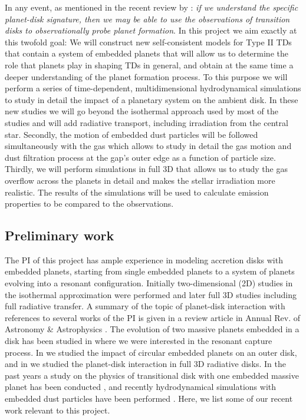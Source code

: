 \documentclass[10pt,fleqn,twoside]{article}
\begin{document}
In any event, as mentioned in the recent review by \citep{2016PASA...33....5O}: 
{\it if we understand the specific planet-disk signature, then we may be able to
use the observations of transition disks to observationally probe planet formation}.
In this project we aim exactly at this twofold goal: We will construct new self-consistent models 
for Type II TDs that contain a system of embedded planets that will allow us to determine
the role that planets play in shaping TDs in general, and obtain at the same time a deeper understanding of the planet
formation process.
To this purpose we will perform a series of time-dependent, multidimensional hydrodynamical 
simulations to study in detail the impact of a planetary system on the ambient disk. 
In these new studies we will go beyond the isothermal approach used
by most of the studies and will add radiative transport, including irradiation from the central star.
Secondly, the motion of embedded dust particles will be followed simultaneously with the gas
which allows to study in detail the gas motion and dust filtration process at the gap's outer edge as a function
of particle size. Thirdly, we will perform simulations in full 3D that allows us to study the gas overflow
across the planets in detail and makes the stellar irradiation more realistic. 
The results of the simulations will be used to calculate emission properties to be compared to the observations.

\subsection{Preliminary work}
The PI of this project has ample experience in modeling accretion disks with embedded planets, starting from single
embedded planets to a system of planets evolving into a resonant configuration. Initially two-dimensional (2D) studies
in the isothermal approximation were performed and later full 3D studies including full radiative transfer. 
A summary of the topic of planet-disk interaction with references to several works of the PI is given in a review
article in Annual Rev. of Astronomy \& Astrophysics \citet{2012ARA&A..50..211K}.
The evolution of two massive planets embedded in a disk has been studied in \citet{2004A&A...414..735K} where
we were interested in the resonant capture process. In \citet{2006A&A...447..369K} we
studied the impact of circular embedded planets on an outer disk, and in
\citet{2009A&A...506..971K} we studied the planet-disk interaction in full 3D radiative disks. 
In the past years a study on the physics of transitional disk 
with one embedded massive planet has been conducted \citet{2013A&A...560A..40M},
and recently hydrodynamical simulations with embedded dust particles have 
been performed \citet{2015A&A...584A.110P,2016A&A...594A..57S}. 
Here, we list some of our recent work relevant to this project.
\end{document}
